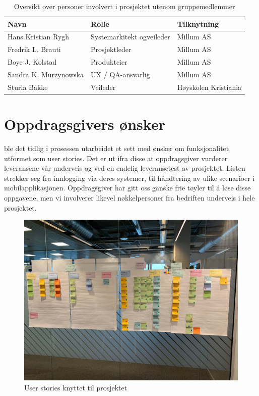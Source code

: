\begin{table}[htbp]
  \centering
  \caption{Oversikt over personer involvert i prosjektet utenom gruppemedlemmer}
    \begin{tabular}{|l|l|p{17.355em}|}
    \toprule
    Navn & Rolle & Tilknytning \\
    \midrule
    \multicolumn{1}{|p{6.43em}|}{Hans Kristian \newline{}Rygh} & \multicolumn{1}{p{7.215em}|}{Systemarkitekt og\newline{}veileder} & Millum AS \\
    \midrule
    Fredrik L. Brauti & Prosjektleder & Millum AS \\
    \midrule
    Boye J. Kolstad & Produkteier & Millum AS \\
    \midrule
    Sandra K. Murzynowska & UX / QA-ansvarlig & Millum AS \\
    \midrule
    Sturla Bakke & Veileder & Høyskolen Kristiania \\
    \bottomrule
    \end{tabular}%
  \label{tab:addlabel}%
\end{table}%

\section{\textbf{Oppdragsgivers ønsker}}
 ble det tidlig i prosessen utarbeidet et sett med ønsker om funksjonalitet utformet som user stories. Det er ut ifra disse at oppdragsgiver vurderer leveransene vår underveis og ved en endelig leveransetest av prosjektet. Listen strekker seg fra innlogging via deres systemer, til håndtering av ulike scenarioer i mobilapplikasjonen. Oppdragsgiver har gitt oss ganske frie tøyler til å løse disse oppgavene, men vi involverer likevel nøkkelpersoner fra bedriften underveis i hele prosjektet.

\begin{figure}[H] 
    \centering
    \includegraphics[width=\textwidth]{figures/Innledning/post-it.jpg}
    \caption{User stories knyttet til prosjektet}
\end{figure}

